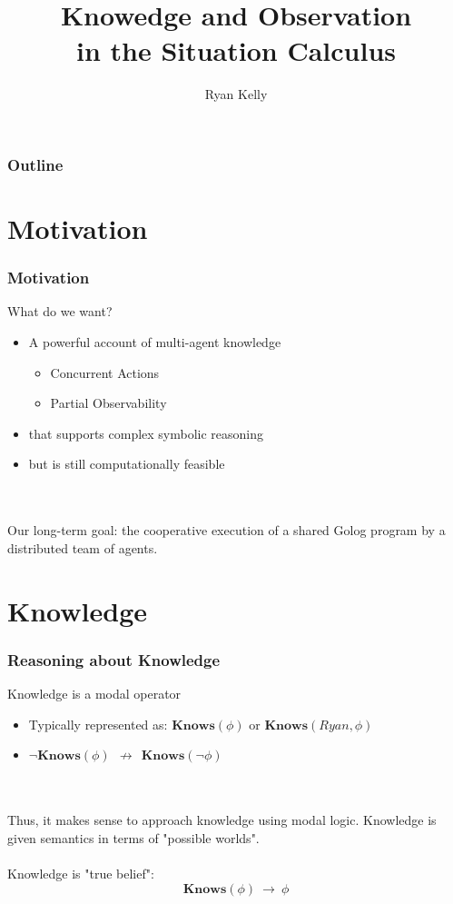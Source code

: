 \documentclass{beamer}
\title{Knowedge and Observation\\ in the Situation Calculus}
\author{Ryan Kelly}
\begin{document}
\begin{frame}
  \titlepage
\end{frame}

\begin{frame}
  \frametitle{Outline}
  \tableofcontents
\end{frame}

\section{Motivation}

\begin{frame}
\frametitle{Motivation}
What do we want?
\begin{itemize}
\item A powerful account of multi-agent knowledge
  \begin{itemize}
  \item Concurrent Actions
  \item Partial Observability
  \end{itemize}
\pause
\item that supports complex symbolic reasoning
\pause
\item but is still computationally feasible
\end{itemize}
\ \\
\ \\
\pause
Our long-term goal: the cooperative execution of a shared Golog program
by a distributed team of agents.
\end{frame}


\section{Knowledge}

\begin{frame}
\frametitle{Reasoning about Knowledge}

Knowledge is a modal operator
\begin{itemize}
\item Typically represented as: $\mathbf{Knows}(\phi)$ or $\mathbf{Knows}(Ryan,\phi)$
\item $\neg\mathbf{Knows}(\phi)\ \ \not\rightarrow\ \ \mathbf{Knows}(\neg\phi)$
\end{itemize}
\ \\
\ \\
Thus, it makes sense to approach knowledge using modal logic.
Knowledge is given semantics in terms of "possible worlds".
\ \\
\ \\
\pause
Knowledge is "true belief":
\[ \mathbf{Knows}(\phi)\ \rightarrow\ \phi \]

\end{frame}
\end{document}
